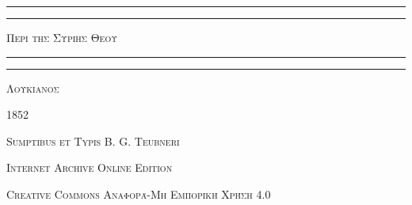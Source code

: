 \documentclass[a4paper, 11pt, oneside, polutonikogreek, german]{article}
\begin{document}
\begin{titlepage} %
	\centering %


	\rule{\textwidth}{1.6pt}\vspace*{-\baselineskip}\vspace*{2pt} %
	\rule{\textwidth}{0.4pt} %
	
	\vspace{1\baselineskip} %
	
	{\scshape\Huge Περι της Συριης Θεου}
	
	\vspace{1\baselineskip} %

	\rule{\textwidth}{0.4pt}\vspace*{-\baselineskip}\vspace{3.2pt} %
	\rule{\textwidth}{1.6pt} %
	
	\vspace{1\baselineskip} %
	
	
	{\scshape \Large Λουκιανος}
 
        \vspace{0.5\baselineskip}
	
	\vspace*{1\baselineskip} %
	
        {\scshape \normalsize } %

        \vspace*{\fill}    

	\vspace{1\baselineskip}

	{\small\scshape 1852}
	
	{\small\scshape{Sumptibus et Typis B. G. Teubneri}}
	
	\vspace{0.5\baselineskip} %

        \scshape Internet Archive Online Edition%
    
	{\scshape\small Creative Commons Αναφορά-Μη Εμπορική Χρήση 4.0} %
\end{titlepage}
\setlength{\parskip}{1mm plus1mm minus1mm}
\clearpage
\end{document}
